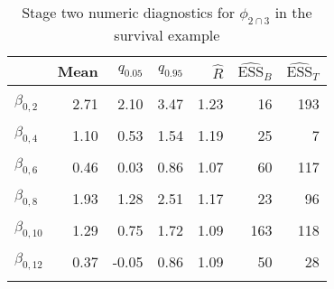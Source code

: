 \begin{table}

\caption{\label{tab:surv-stage-two-diag-phi-23}Stage two numeric diagnostics for $\phi_{2 \cap 3}$ in the survival example}
\centering
\begin{tabular}[t]{lrrrrrr}
\toprule
  & Mean & $q_{0.05}$ & $q_{0.95}$ & $\widehat{R}$ & $\widehat{\text{ESS}}_{B}$ & $\widehat{\text{ESS}}_{T}$\\
\midrule
\cellcolor{gray!6}{$\beta_{0, 1}$} & \cellcolor{gray!6}{1.21} & \cellcolor{gray!6}{0.65} & \cellcolor{gray!6}{1.82} & \cellcolor{gray!6}{1.15} & \cellcolor{gray!6}{287} & \cellcolor{gray!6}{422}\\
$\beta_{0, 2}$ & 2.71 & 2.10 & 3.47 & 1.23 & 16 & 193\\
\cellcolor{gray!6}{$\beta_{0, 3}$} & \cellcolor{gray!6}{0.67} & \cellcolor{gray!6}{-0.21} & \cellcolor{gray!6}{1.68} & \cellcolor{gray!6}{1.34} & \cellcolor{gray!6}{12} & \cellcolor{gray!6}{126}\\
$\beta_{0, 4}$ & 1.10 & 0.53 & 1.54 & 1.19 & 25 & 7\\
\cellcolor{gray!6}{$\beta_{0, 5}$} & \cellcolor{gray!6}{0.25} & \cellcolor{gray!6}{-0.56} & \cellcolor{gray!6}{0.98} & \cellcolor{gray!6}{1.31} & \cellcolor{gray!6}{13} & \cellcolor{gray!6}{7}\\
$\beta_{0, 6}$ & 0.46 & 0.03 & 0.86 & 1.07 & 60 & 117\\
\cellcolor{gray!6}{$\beta_{0, 7}$} & \cellcolor{gray!6}{1.05} & \cellcolor{gray!6}{0.47} & \cellcolor{gray!6}{1.52} & \cellcolor{gray!6}{1.04} & \cellcolor{gray!6}{158} & \cellcolor{gray!6}{111}\\
$\beta_{0, 8}$ & 1.93 & 1.28 & 2.51 & 1.17 & 23 & 96\\
\cellcolor{gray!6}{$\beta_{0, 9}$} & \cellcolor{gray!6}{1.81} & \cellcolor{gray!6}{1.23} & \cellcolor{gray!6}{2.62} & \cellcolor{gray!6}{1.11} & \cellcolor{gray!6}{35} & \cellcolor{gray!6}{126}\\
$\beta_{0, 10}$ & 1.29 & 0.75 & 1.72 & 1.09 & 163 & 118\\
\cellcolor{gray!6}{$\beta_{0, 11}$} & \cellcolor{gray!6}{2.86} & \cellcolor{gray!6}{2.41} & \cellcolor{gray!6}{3.37} & \cellcolor{gray!6}{1.12} & \cellcolor{gray!6}{32} & \cellcolor{gray!6}{171}\\
$\beta_{0, 12}$ & 0.37 & -0.05 & 0.86 & 1.09 & 50 & 28\\
\cellcolor{gray!6}{$\beta_{0, 13}$} & \cellcolor{gray!6}{1.93} & \cellcolor{gray!6}{1.32} & \cellcolor{gray!6}{2.59} & \cellcolor{gray!6}{1.15} & \cellcolor{gray!6}{55} & \cellcolor{gray!6}{192}\\

\end{tabular}
\end{table}
